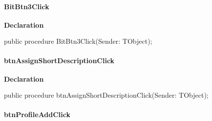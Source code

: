 \documentclass{report}
\newif\ifpdf
\begin{document}
\paragraph*{BitBtn3Click}\hspace*{\fill}

\label{prjwizard.TfrmProjectWizard-BitBtn3Click}
\begin{list}{}{
\setlength{\itemindent}{0cm}
\setlength{\listparindent}{0cm}
\setlength{\leftmargin}{\evensidemargin}
\addtolength{\leftmargin}{\tmplength}
\settowidth{\labelsep}{X}
\addtolength{\leftmargin}{\labelsep}
\setlength{\labelwidth}{\tmplength}
}
\item[\textbf{Declaration}\hfill]
\ifpdf
\begin{flushleft}
\fi
\begin{ttfamily}
public procedure BitBtn3Click(Sender: TObject);\end{ttfamily}

\ifpdf
\end{flushleft}
\fi

\end{list}
\paragraph*{btnAssignShortDescriptionClick}\hspace*{\fill}

\label{prjwizard.TfrmProjectWizard-btnAssignShortDescriptionClick}
\begin{list}{}{
\setlength{\itemindent}{0cm}
\setlength{\listparindent}{0cm}
\setlength{\leftmargin}{\evensidemargin}
\addtolength{\leftmargin}{\tmplength}
\settowidth{\labelsep}{X}
\addtolength{\leftmargin}{\labelsep}
\setlength{\labelwidth}{\tmplength}
}
\item[\textbf{Declaration}\hfill]
\ifpdf
\begin{flushleft}
\fi
\begin{ttfamily}
public procedure btnAssignShortDescriptionClick(Sender: TObject);\end{ttfamily}

\ifpdf
\end{flushleft}
\fi

\end{list}
\paragraph*{btnProfileAddClick}\hspace*{\fill}
\end{document}
